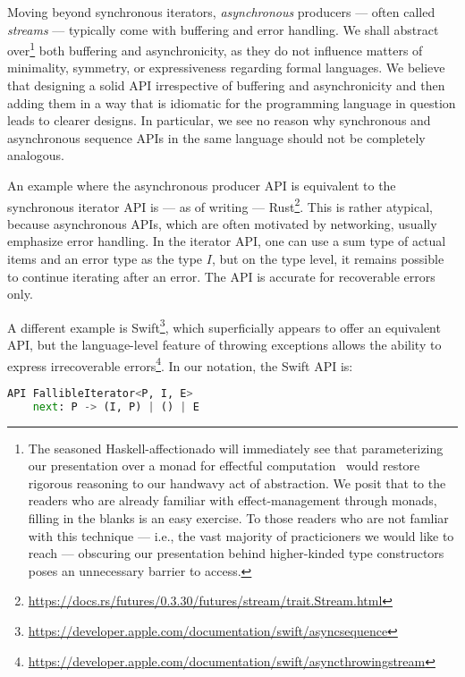 \documentclass[sigplan,screen,10pt,anonymous,review]{acmart}
\begin{document}
Moving beyond synchronous iterators, \textit{asynchronous} producers --- often called \textit{streams} --- typically come with buffering and error handling. We shall abstract over\footnote{The seasoned Haskell-affectionado will immediately see that parameterizing our presentation over a monad for effectful computation~\cite{wadler1995monads} would restore rigorous reasoning to our handwavy act of abstraction. We posit that to the readers who are already familiar with effect-management through monads, filling in the blanks is an easy exercise. To those readers who are not famliar with this technique --- i.e., the vast majority of practicioners we would like to reach --- obscuring our presentation behind higher-kinded type constructors poses an unnecessary barrier to access.} both buffering and asynchronicity, as they do not influence matters of minimality, symmetry, or expressiveness regarding formal languages. We believe that designing a solid API irrespective of buffering and asynchronicity and then adding them in a way that is idiomatic for the programming language in question leads to clearer designs. In particular, we see no reason why synchronous and asynchronous sequence APIs in the same language should not be completely analogous.

An example where the asynchronous producer API is equivalent to the synchronous iterator API is --- as of writing --- Rust\footnote{\url{https://docs.rs/futures/0.3.30/futures/stream/trait.Stream.html}}. This is rather atypical, because asynchronous APIs, which are often motivated by networking, usually emphasize error handling. In the iterator API, one can use a sum type of actual items and an error type as the type $I$, but on the type level, it remains possible to continue iterating after an error. The API is accurate for recoverable errors only.

A different example is Swift\footnote{\url{https://developer.apple.com/documentation/swift/asyncsequence}}, which superficially appears to offer an equivalent API, but the language-level feature of throwing exceptions allows the ability to express irrecoverable errors\footnote{\url{https://developer.apple.com/documentation/swift/asyncthrowingstream}}. In our notation, the Swift API is:

\begin{lstlisting}[language=Python]
API FallibleIterator<P, I, E>
    next: P -> (I, P) | () | E
\end{lstlisting}
\end{document}
